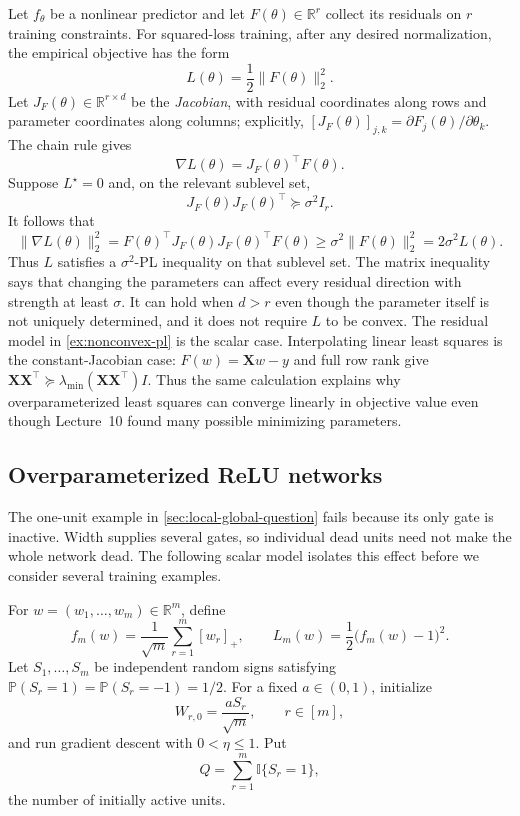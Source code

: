 \documentclass[11pt,twoside]{article}
\newcommand{\I}{\mathbb I}
\renewcommand{\P}{\mathbb P}
\newcommand{\R}{\mathbb R}
\theoremstyle{definition}
\theoremstyle{remark}
\begin{document}
Let $f_\theta$ be a nonlinear predictor and let $F(\theta)\in\R^r$ collect
its residuals on $r$ training constraints. For squared-loss training, after
any desired normalization, the empirical objective has the form
\[
 L(\theta)=\frac12\|F(\theta)\|_2^2.
\]
Let $J_F(\theta)\in\R^{r\times d}$ be the \emph{Jacobian}, with residual coordinates
along rows and parameter coordinates along columns; explicitly,
$[J_F(\theta)]_{j,k}=\partial F_j(\theta)/\partial\theta_k$. The chain rule
gives
\[
 \nabla L(\theta)=J_F(\theta)^\top F(\theta).
\]
Suppose $L^\star=0$ and, on the relevant sublevel set,
\begin{equation}
 J_F(\theta)J_F(\theta)^\top\succeq\sigma^2I_r.
 \label{eq:jacobian-coverage}
\end{equation}
It follows that
\[
 \|\nabla L(\theta)\|_2^2
 =F(\theta)^\top J_F(\theta)J_F(\theta)^\top F(\theta)
 \ge\sigma^2\|F(\theta)\|_2^2
 =2\sigma^2L(\theta).
\]
Thus $L$ satisfies a $\sigma^2$-PL inequality on that sublevel set. The
matrix inequality says that changing the parameters can affect every residual
direction with strength at least $\sigma$. It can hold when $d>r$ even though
the parameter itself is not uniquely determined, and it does not require $L$
to be convex. The residual model in \cref{ex:nonconvex-pl} is the scalar case.
Interpolating linear least squares is the constant-Jacobian case:
$F(w)=\mathbf Xw-y$ and full row rank give
$\mathbf X\mathbf X^\top\succeq
\lambda_{\min}(\mathbf X\mathbf X^\top)I$. Thus the same calculation explains
why overparameterized least squares can converge linearly in objective value
even though Lecture~10 found many possible minimizing parameters.

\subsection{Overparameterized ReLU networks}
\label{sec:wide-relu}

The one-unit example in \cref{sec:local-global-question} fails because its
only gate is inactive. Width supplies several gates, so individual dead units
need not make the whole network dead. The following scalar model isolates
this effect before we consider several training examples.

For $w=(w_1,\ldots,w_m)\in\R^m$, define
\begin{equation}
 f_m(w)=\frac1{\sqrt m}\sum_{r=1}^m[w_r]_+,
 \qquad
 L_m(w)=\frac12\bigl(f_m(w)-1\bigr)^2.
 \label{eq:wide-relu-scalar}
\end{equation}
Let $S_1,\ldots,S_m$ be independent random signs satisfying
$\P(S_r=1)=\P(S_r=-1)=1/2$. For a fixed $a\in(0,1)$, initialize
\[
 W_{r,0}=\frac{aS_r}{\sqrt m},
 \qquad r\in[m],
\]
and run gradient descent with $0<\eta\le1$. Put
\[
 Q=\sum_{r=1}^m\I\{S_r=1\},
\]
the number of initially active units.
\end{document}
